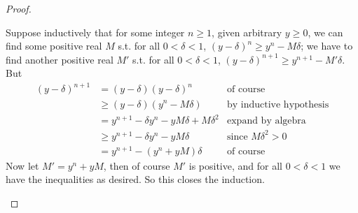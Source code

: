 \begin{proof}
\begin{enumerate}
\begin{itemize}
        Suppose inductively that for some integer \(n \ge 1\), given arbitrary \(y \ge 0\), we can find some positive real \(M\) s.t. for all \(0 < \delta < 1\), \((y - \delta)^n \ge y^n - M\delta\);
        we have to find another positive real \(M'\) s.t. for all \(0 < \delta < 1\), \((y - \delta)^{n + 1} \ge y^{n + 1} - M' \delta \).
        But
        \begin{align*}
            (y - \delta)^{n + 1} & = (y - \delta)(y - \delta)^n & \text{of course} \\
                                 & \ge (y - \delta)(y^n - M\delta) & \text{by inductive hypothesis} \\
                                 & = y^{n + 1} - \delta y^n - yM\delta + M\delta^2 & \text{expand by algebra} \\
                                 & \ge y^{n + 1} - \delta y^n - yM\delta & \text{since \(M\delta^2 > 0\)} \\
                                 & = y^{n + 1} - (y^n + yM)\delta & \text{of course}
        \end{align*}
        Now let \(M' = y^n + yM\), then of course \(M'\) is positive, and for all \(0 < \delta < 1\) we have the inequalities as desired.
        So this closes the induction.
        

\end{itemize}
\end{enumerate}
\end{proof}
